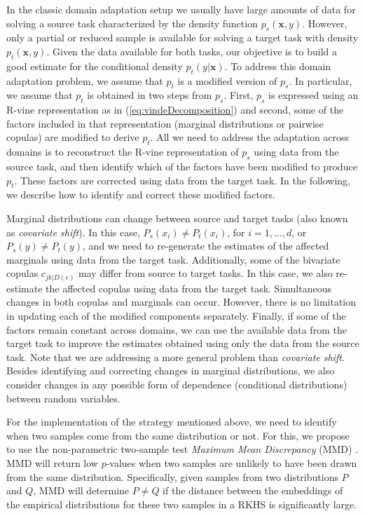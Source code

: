 \documentclass{article}
\begin{document}
In the classic domain adaptation setup we usually have large amounts of data
for solving a source task characterized by the density function
$p_s(\mathbf{x}, y)$. However, only a partial or reduced sample is available
for solving a target task with density $p_t(\mathbf{x}, y)$. Given the data
available for both tasks, our objective is to build a good estimate for the
conditional density $p_t(y | \mathbf{x})$.  To address this domain
adaptation problem, we assume that $p_t$ is a modified version of $p_s$.
In particular, we assume that $p_t$ is obtained in two steps from $p_s$.
First, $p_s$ is expressed using an R-vine representation as in
(\ref{eq:vindeDecomposition}) and second, some of the factors included in
that representation (marginal distributions or pairwise copulas) are
modified to derive $p_t$.  All we need to address the adaptation across
domains is to reconstruct the R-vine representation of $p_s$ using data
from the source task, and then identify which of the factors have been
modified to produce $p_t$. These factors are corrected using data from the
target task. In the following, we describe how to identify and correct
these modified factors.

Marginal distributions can change between source and target tasks (also known
as \emph{covariate shift}).  In this case, $P_s(x_i) \neq P_t(x_i)$, for
$i=1,\ldots,d$, or $P_s(y) \neq P_t(y)$, and we need to re-generate the
estimates of the affected marginals using data from the target task.
Additionally, some of the bivariate copulas $c_{jk|D(e)}$ may differ from
source to target tasks.  In this case, we also re-estimate the affected copulas
using data from the target task.  Simultaneous changes in both copulas and
marginals can occur. However, there is no limitation in updating each of the
modified components separately.  Finally, if some of the factors remain
constant across domains, we can use the available data from the target task to
improve the estimates obtained using only the data from the source task.  Note
that we are addressing a more general problem than \emph{covariate shift}.
Besides identifying and correcting changes in marginal distributions, we also
consider changes in any possible form of dependence (conditional distributions)
between random variables.

For the implementation of the strategy mentioned above, we need to identify
when two samples come from the same distribution or not. For this, we propose
to use the non-parametric two-sample test \emph{Maximum Mean Discrepancy} (MMD)
\cite{mmd}.  MMD will return low $p$-values when two samples are unlikely to
have been drawn from the same distribution.  Specifically, given samples from
two distributions $P$ and $Q$, MMD will determine $P\neq Q$ if the distance
between the embeddings of the empirical distributions for these two samples in
a RKHS is significantly large.
\end{document}

